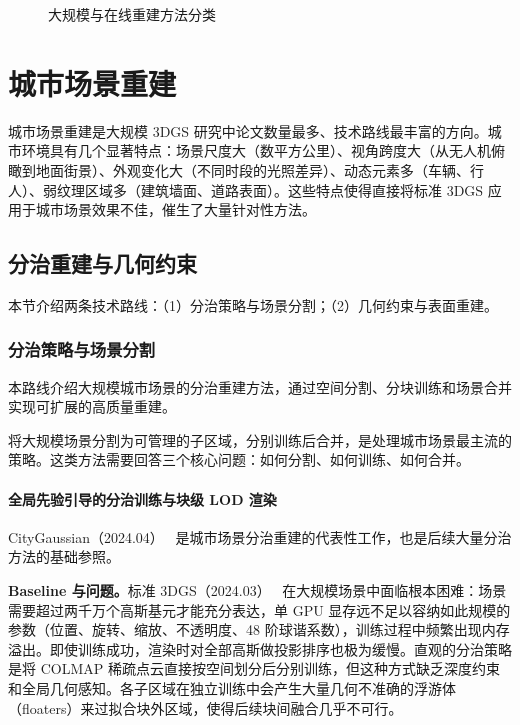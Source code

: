 \begin{figure}[htbp]
\centering
\resizebox{\textwidth}{!}{}
\caption{大规模与在线重建方法分类}
\label{fig:ch14_large_scale_taxonomy}
\end{figure}

\section{城市场景重建}
\label{sec:14_1}

城市场景重建是大规模 3DGS 研究中论文数量最多、技术路线最丰富的方向。城市环境具有几个显著特点：场景尺度大（数平方公里）、视角跨度大（从无人机俯瞰到地面街景）、外观变化大（不同时段的光照差异）、动态元素多（车辆、行人）、弱纹理区域多（建筑墙面、道路表面）。这些特点使得直接将标准 3DGS 应用于城市场景效果不佳，催生了大量针对性方法。

\subsection{分治重建与几何约束}
\label{ss:14_1}

本节介绍两条技术路线：（1）分治策略与场景分割；（2）几何约束与表面重建。

\subsubsection{分治策略与场景分割}

本路线介绍大规模城市场景的分治重建方法，通过空间分割、分块训练和场景合并实现可扩展的高质量重建。

将大规模场景分割为可管理的子区域，分别训练后合并，是处理城市场景最主流的策略。这类方法需要回答三个核心问题：如何分割、如何训练、如何合并。

\paragraph{全局先验引导的分治训练与块级 LOD 渲染}

CityGaussian（2024.04）~\cite{2404_01133} 是城市场景分治重建的代表性工作，也是后续大量分治方法的基础参照。

\textbf{Baseline 与问题。}标准 3DGS（2024.03）~\cite{2403_10103} 在大规模场景中面临根本困难：场景需要超过两千万个高斯基元才能充分表达，单 GPU 显存远不足以容纳如此规模的参数（位置、旋转、缩放、不透明度、48 阶球谐系数），训练过程中频繁出现内存溢出。即使训练成功，渲染时对全部高斯做投影排序也极为缓慢。直观的分治策略是将 COLMAP 稀疏点云直接按空间划分后分别训练，但这种方式缺乏深度约束和全局几何感知。各子区域在独立训练中会产生大量几何不准确的浮游体（floaters）来过拟合块外区域，使得后续块间融合几乎不可行。

